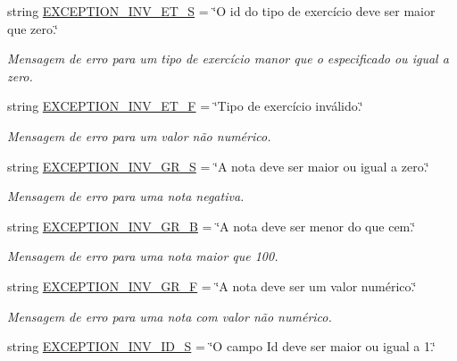 \begin{DoxyCompactItemize}
string \hyperlink{namespaceELO_1_1lang_1_1pt__br_acd9ea5df1a26bfe4f7341fa58bfc9e2b}{E\-X\-C\-E\-P\-T\-I\-O\-N\-\_\-\-I\-N\-V\-\_\-\-E\-T\-\_\-\-S} = \char`\"{}O id do tipo de exercício deve ser maior que zero.\char`\"{}
\begin{DoxyCompactList}\small\item\em Mensagem de erro para um tipo de exercício manor que o especificado ou igual a zero. \end{DoxyCompactList}\item 
string \hyperlink{namespaceELO_1_1lang_1_1pt__br_ae7a2eea8b3cf7b835f5ec0334fe49ecc}{E\-X\-C\-E\-P\-T\-I\-O\-N\-\_\-\-I\-N\-V\-\_\-\-E\-T\-\_\-\-F} = \char`\"{}Tipo de exercício inválido.\char`\"{}
\begin{DoxyCompactList}\small\item\em Mensagem de erro para um valor não numérico. \end{DoxyCompactList}\item 
string \hyperlink{namespaceELO_1_1lang_1_1pt__br_aa145dfa8cb4cf5ed4e5ba3cfeaa0d778}{E\-X\-C\-E\-P\-T\-I\-O\-N\-\_\-\-I\-N\-V\-\_\-\-G\-R\-\_\-\-S} = \char`\"{}A nota deve ser maior ou igual a zero.\char`\"{}
\begin{DoxyCompactList}\small\item\em Mensagem de erro para uma nota negativa. \end{DoxyCompactList}\item 
string \hyperlink{namespaceELO_1_1lang_1_1pt__br_a68c2963160eddf7e83f68cba601ebb7d}{E\-X\-C\-E\-P\-T\-I\-O\-N\-\_\-\-I\-N\-V\-\_\-\-G\-R\-\_\-\-B} = \char`\"{}A nota deve ser menor do que cem.\char`\"{}
\begin{DoxyCompactList}\small\item\em Mensagem de erro para uma nota maior que 100. \end{DoxyCompactList}\item 
string \hyperlink{namespaceELO_1_1lang_1_1pt__br_a50b59c97fa4fc79305e05bfd0ffbeb8a}{E\-X\-C\-E\-P\-T\-I\-O\-N\-\_\-\-I\-N\-V\-\_\-\-G\-R\-\_\-\-F} = \char`\"{}A nota deve ser um valor numérico.\char`\"{}
\begin{DoxyCompactList}\small\item\em Mensagem de erro para uma nota com valor não numérico. \end{DoxyCompactList}\item 
string \hyperlink{namespaceELO_1_1lang_1_1pt__br_ac15a5de4e4d5b7e566f530b8819137de}{E\-X\-C\-E\-P\-T\-I\-O\-N\-\_\-\-I\-N\-V\-\_\-\-I\-D\-\_\-\-S} = \char`\"{}O campo Id deve ser maior ou igual a 1.\char`\"{}

\end{DoxyCompactItemize}
